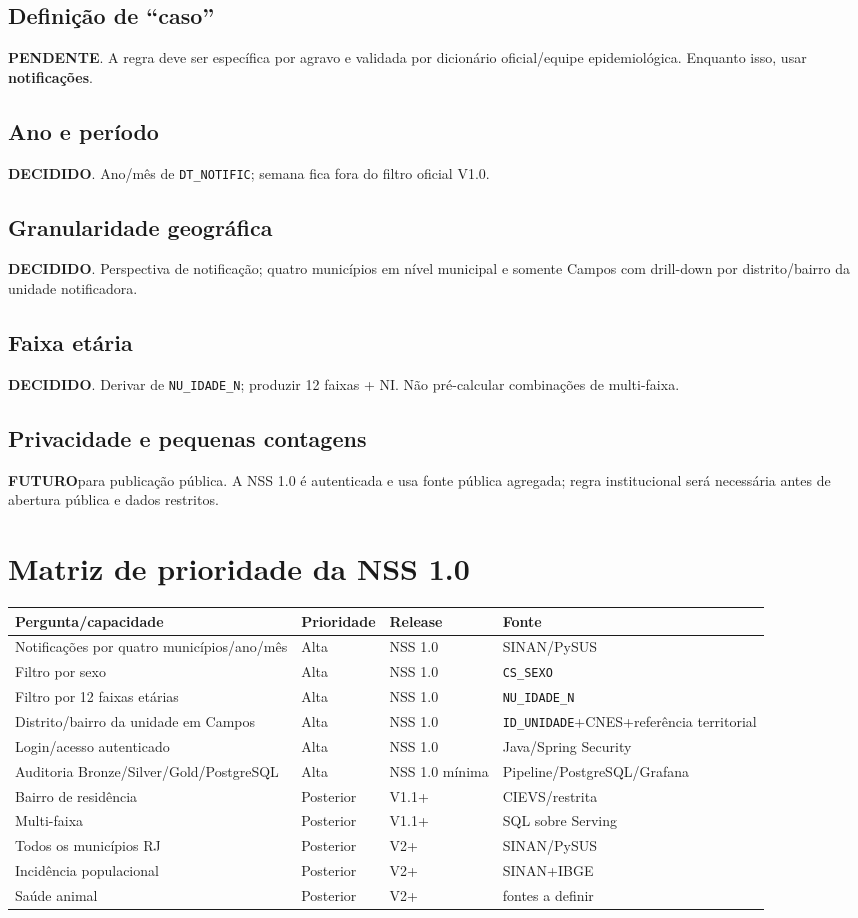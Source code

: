 \documentclass[12pt,a4paper]{article}
\newcommand{\statusDecidido}{\textcolor{decidido}{\textbf{DECIDIDO}}}\newcommand{\statusPendente}{\textcolor{pendente}{\textbf{PENDENTE}}}\newcommand{\statusFuturo}{\textcolor{futuro}{\textbf{FUTURO}}}
\begin{document}
\subsection{Definição de ``caso''}\statusPendente. A regra deve ser específica por agravo e validada por dicionário oficial/equipe epidemiológica. Enquanto isso, usar \textbf{notificações}.
\subsection{Ano e período}\statusDecidido. Ano/mês de \texttt{DT\_NOTIFIC}; semana fica fora do filtro oficial V1.0.
\subsection{Granularidade geográfica}\statusDecidido. Perspectiva de notificação; quatro municípios em nível municipal e somente Campos com drill-down por distrito/bairro da unidade notificadora.
\subsection{Faixa etária}\statusDecidido. Derivar de \texttt{NU\_IDADE\_N}; produzir 12 faixas + NI. Não pré-calcular combinações de multi-faixa.
\subsection{Privacidade e pequenas contagens}\statusFuturo para publicação pública. A NSS 1.0 é autenticada e usa fonte pública agregada; regra institucional será necessária antes de abertura pública e dados restritos.
\section{Matriz de prioridade da NSS 1.0}
\begin{longtable}{p{6.1cm}p{2.4cm}p{2.2cm}p{4.1cm}}\toprule\textbf{Pergunta/capacidade} & \textbf{Prioridade} & \textbf{Release} & \textbf{Fonte} \\\midrule
Notificações por quatro municípios/ano/mês & Alta & NSS 1.0 & SINAN/PySUS \\
Filtro por sexo & Alta & NSS 1.0 & \texttt{CS\_SEXO} \\
Filtro por 12 faixas etárias & Alta & NSS 1.0 & \texttt{NU\_IDADE\_N} \\
Distrito/bairro da unidade em Campos & Alta & NSS 1.0 & \texttt{ID\_UNIDADE}+CNES+referência territorial \\
Login/acesso autenticado & Alta & NSS 1.0 & Java/Spring Security \\
Auditoria Bronze/Silver/Gold/PostgreSQL & Alta & NSS 1.0 mínima & Pipeline/PostgreSQL/Grafana \\
Bairro de residência & Posterior & V1.1+ & CIEVS/restrita \\
Multi-faixa & Posterior & V1.1+ & SQL sobre Serving \\
Todos os municípios RJ & Posterior & V2+ & SINAN/PySUS \\
Incidência populacional & Posterior & V2+ & SINAN+IBGE \\
Saúde animal & Posterior & V2+ & fontes a definir \\
\bottomrule\end{longtable}
\end{document}
